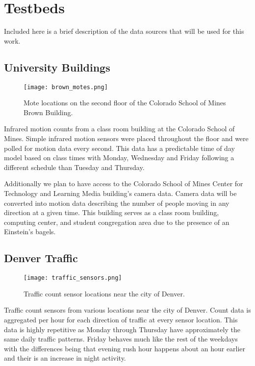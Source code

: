 \chapter{Testbeds}
Included here is a brief description of the data sources that will be used for this work.

\section{University Buildings}
\begin{figure}[ht]
\begin{center}
\texttt{[image: brown\_motes.png]}
\end{center}
\caption{Mote locations on the second floor of the Colorado School of Mines Brown Building.}
\label{fig:brown_motes}
\end{figure}

Infrared motion counts from a class room building at the Colorado School of Mines.  Simple infrared motion sensors were placed throughout the floor and were polled for motion data every second.  This data has a predictable time of day model based on class times with Monday, Wednesday and Friday following a different schedule than Tuesday and Thursday.

Additionally we plan to have access to the Colorado School of Mines Center for Technology and Learning Media building's camera data.  Camera data will be converted into motion data describing the number of people moving in any direction at a given time.  This building serves as a class room building, computing center, and student congregation area due to the presence of an Einstein's bagels.  

\section{Denver Traffic}
\begin{figure}[ht]
\begin{center}
\texttt{[image: traffic\_sensors.png]}
\end{center}
\caption{Traffic count sensor locations near the city of Denver.}
\label{fig:denver_sensors}
\end{figure}

Traffic count sensors from various locations near the city of Denver.  Count data is aggregated per hour for each direction of traffic at every sensor location.  This data is highly repetitive as Monday through Thursday have approximately the same daily traffic patterns.  Friday behaves much like the rest of the weekdays with the differences being that evening rush hour happens about an hour earlier and their is an increase in night activity.  


